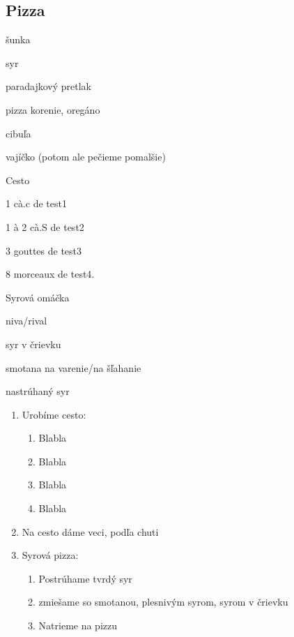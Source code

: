 \setcounter{step}{0}
\subsection{Pizza}

\begin{ingredient}
\def\portions{4}%

\begin{main}
	\item šunka
	\item syr
	\item paradajkový pretlak
	\item pizza korenie, oregáno
	\item cibuľa
	\item vajíčko (potom ale pečieme pomalšie)
\end{main}
\begin{subingredient}{Cesto}
	\item 1 cà.c de test1
	\item 1 à 2 cà.S de test2
	\item 3 gouttes de test3
	\item 8 morceaux de test4.	
\end{subingredient}

\begin{subingredient}{Syrová omáčka}
	\item niva/rival
	\item syr v črievku
	\item smotana na varenie/na šľahanie
	\item nastrúhaný syr
\end{subingredient}
\end{ingredient}
\begin{recipe}

\begin{enumerate}

\item{Urobíme cesto:}
\begin{enumerate}
\item{Blabla}
\item{Blabla}
\item{Blabla}
\item{Blabla}
\end{enumerate}
\item{Na cesto dáme veci, podľa chuti}

\item{Syrová pizza:}
\begin{enumerate}
\item{Postrúhame tvrdý syr}
\item{zmiešame so smotanou, plesnivým syrom, syrom v črievku}
\item{Natrieme na pizzu}
\end{enumerate}

\end{enumerate}
\end{recipe}

\begin{notes}

\end{notes}
\clearpage	